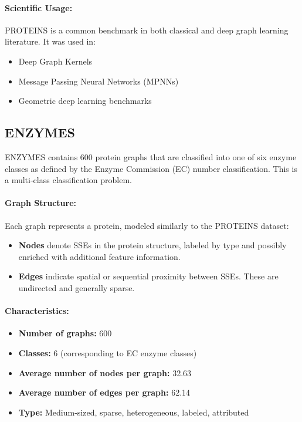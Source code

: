 \documentclass[11pt,a4paper]{article}
\begin{document}
\paragraph{Scientific Usage:}
PROTEINS is a common benchmark in both classical and deep graph learning literature. It was used in:
\begin{itemize}
	\item Deep Graph Kernels \cite{yanardag2015deep}
	\item Message Passing Neural Networks (MPNNs) \cite{morris2020tudataset}
	\item Geometric deep learning benchmarks \cite{dwivedi2020benchmarking}
\end{itemize}

\subsection*{ENZYMES}

ENZYMES contains 600 protein graphs that are classified into one of six enzyme classes as defined by the Enzyme Commission (EC) number classification. This is a multi-class classification problem.

\paragraph{Graph Structure:}
Each graph represents a protein, modeled similarly to the PROTEINS dataset:
\begin{itemize}
	\item \textbf{Nodes} denote SSEs in the protein structure, labeled by type and possibly enriched with additional feature information.
	\item \textbf{Edges} indicate spatial or sequential proximity between SSEs. These are undirected and generally sparse.
\end{itemize}

\paragraph{Characteristics:}
\begin{itemize}
	\item \textbf{Number of graphs:} 600
	\item \textbf{Classes:} 6 (corresponding to EC enzyme classes)
	\item \textbf{Average number of nodes per graph:} 32.63
	\item \textbf{Average number of edges per graph:} 62.14
	\item \textbf{Type:} Medium-sized, sparse, heterogeneous, labeled, attributed
\end{itemize}
\end{document}

